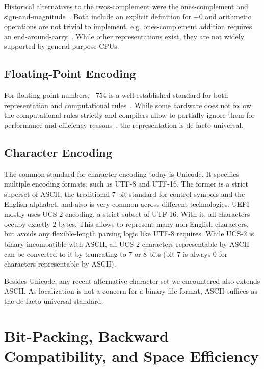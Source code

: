 Historical alternatives to the \gls{twos-complement} were the \gls{ones-complement} and \gls{sign-and-magnitude}~\cite{ISO:2018:III}. Both include an explicit definition for $-0$ and arithmetic operations are not trivial to implement, e.g. \gls{ones-complement} addition requires an end-around-carry~\cite{1674817}. While other representations exist, they are not widely supported by general-purpose \glspl{CPU}.

\subsection{Floating-Point Encoding}

For floating-point numbers, ~754 is a well-established standard for both representation and computational rules~\cite{8766229}. While some hardware does not follow the computational rules strictly and compilers allow to partially ignore them for performance and efficiency reasons~\cite{gcc}, the representation is de facto universal.

\subsection{Character Encoding}

The common standard for character encoding today is Unicode. It specifies multiple encoding formats, such as UTF-8 and UTF-16. The former is a strict superset of ASCII, the traditional 7-bit standard for control symbols and the English alphabet, and also is very common across different technologies. UEFI mostly uses UCS-2 encoding, a strict subset of UTF-16. With it, all characters occupy exactly $2$ \glspl{byte}. This allows to represent many non-English characters, but avoids any flexible-length parsing logic like UTF-8 requires. While UCS-2 is binary-incompatible with ASCII, all UCS-2 characters representable by ASCII can be converted to it by truncating to 7 or 8 bits (bit 7 is always 0 for characters representable by ASCII).

Besides Unicode, any recent alternative character set we encountered also extends ASCII. As localization is not a concern for a binary file format, ASCII suffices as the de-facto universal standard.

\section{Bit-Packing, Backward Compatibility, and Space Efficiency}

